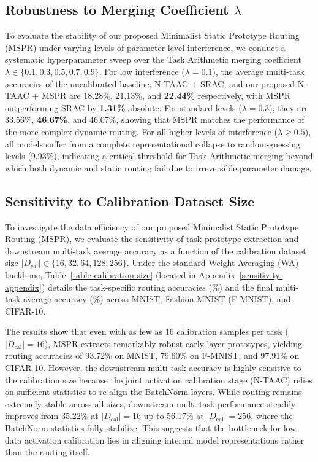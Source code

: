 \documentclass{article}
\theoremstyle{plain}
\theoremstyle{definition}
\theoremstyle{remark}
\begin{document}
\subsection{Robustness to Merging Coefficient \texorpdfstring{$\lambda$}{lambda}}
To evaluate the stability of our proposed Minimalist Static Prototype Routing (MSPR) under varying levels of parameter-level interference, we conduct a systematic hyperparameter sweep over the Task Arithmetic merging coefficient $\lambda \in \{0.1, 0.3, 0.5, 0.7, 0.9\}$. For low interference ($\lambda = 0.1$), the average multi-task accuracies of the uncalibrated baseline, N-TAAC + SRAC, and our proposed N-TAAC + MSPR are 18.28\%, 21.13\%, and \textbf{22.44\%} respectively, with MSPR outperforming SRAC by \textbf{1.31\%} absolute. For standard levels ($\lambda = 0.3$), they are 33.56\%, \textbf{46.67\%}, and 46.07\%, showing that MSPR matches the performance of the more complex dynamic routing. For all higher levels of interference ($\lambda \ge 0.5$), all models suffer from a complete representational collapse to random-guessing levels (9.93\%), indicating a critical threshold for Task Arithmetic merging beyond which both dynamic and static routing fail due to irreversible parameter damage.

\subsection{Sensitivity to Calibration Dataset Size}
To investigate the data efficiency of our proposed Minimalist Static Prototype Routing (MSPR), we evaluate the sensitivity of task prototype extraction and downstream multi-task average accuracy as a function of the calibration dataset size $|D_{\text{cal}}| \in \{16, 32, 64, 128, 256\}$. Under the standard Weight Averaging (WA) backbone, Table~\ref{table-calibration-size} (located in Appendix~\ref{sensitivity-appendix}) details the task-specific routing accuracies (\%) and the final multi-task average accuracy (\%) across MNIST, Fashion-MNIST (F-MNIST), and CIFAR-10.

The results show that even with as few as 16 calibration samples per task ($|D_{\text{cal}}| = 16$), MSPR extracts remarkably robust early-layer prototypes, yielding routing accuracies of 93.72\% on MNIST, 79.60\% on F-MNIST, and 97.91\% on CIFAR-10. However, the downstream multi-task accuracy is highly sensitive to the calibration size because the joint activation calibration stage (N-TAAC) relies on sufficient statistics to re-align the BatchNorm layers. While routing remains extremely stable across all sizes, downstream multi-task performance steadily improves from 35.22\% at $|D_{\text{cal}}| = 16$ up to 56.17\% at $|D_{\text{cal}}| = 256$, where the BatchNorm statistics fully stabilize. This suggests that the bottleneck for low-data activation calibration lies in aligning internal model representations rather than the routing itself.
\end{document}
